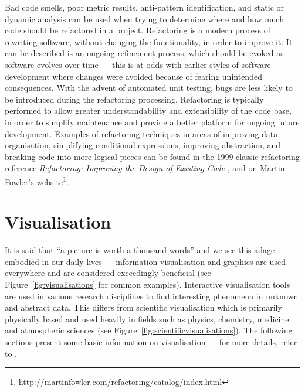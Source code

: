 Bad code smells, poor metric results, anti-pattern identification, and static or dynamic analysis can be used when trying to determine where and how much code should be refactored in a project. Refactoring is a modern process of rewriting software, without changing the functionality, in order to improve it. It can be described is an ongoing refinement process, which should be evoked as software evolves over time --- this is at odds with earlier styles of software development where changes were avoided because of fearing unintended consequences. With the advent of automated unit testing, bugs are less likely to be introduced during the refactoring processing. Refactoring is typically performed to allow greater understandability and extensibility of the code base, in order to simplify maintenance and provide a better platform for ongoing future development. Examples of refactoring techniques in areas of improving data organisation, simplifying conditional expressions, improving abstraction, and breaking code into more logical pieces can be found in the 1999 classic refactoring reference \textit{Refactoring: Improving the Design of Existing Code} \citep{fowler99}, and on Martin Fowler's website\footnote{\url{http://martinfowler.com/refactoring/catalog/index.html}}.

\section{Visualisation}\label{sect:vis}

It is said that ``a picture is worth a thousand words'' and we see this adage embodied in our daily lives --- information visualisation and graphics are used everywhere and are considered exceedingly beneficial (see Figure~\vref{fig:visualisations} for common examples). Interactive visualisation tools are used in various research disciplines to find interesting phenomena in unknown and abstract data. This differs from scientific visualisation which is primarily physically based and used heavily in fields such as physics, chemistry, medicine and atmospheric sciences (see Figure~\vref{fig:scientificvisualisations}). The following sections present some basic information on visualisation --- for more details, refer to \citep[][]{ware04, spence07}.


